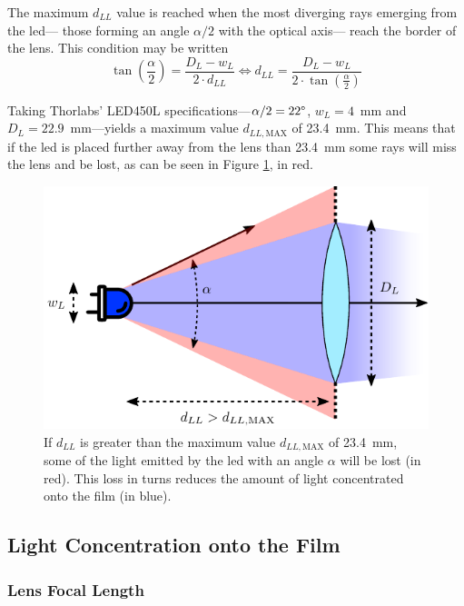 The maximum $d_{LL}$ value is reached when the most diverging rays emerging from the \gls{led}---\ie{} those forming an angle $\alpha/2$ with the optical axis--- reach the border of the lens. This condition may be written
\begin{equation}
	\tan \left( \frac{\alpha}{2} \right) = \frac{D_L - w_L}{2 \cdot d_{LL}} \iff
	d_{LL} = \frac{D_L - w_L}{2 \cdot \tan \left( \frac{\alpha}{2}\right) }
\end{equation}

Taking Thorlabs' LED450L specifications---$\alpha/2=22\degree$, $w_L=4$~mm and $D_L=22.9$~mm---yields a maximum value $d_{LL,\mathrm{MAX}}$ of 23.4~mm. This means that if the \gls{led} is placed further away from the lens than 23.4~mm some rays will miss the lens and be lost, as can be seen in Figure \ref{anfig:optics:illuminating_lost_rays}, in red.

\begin{figure}
	\centering
	\includegraphics{2_appendices/optical_figures/illuminating_lost_rays_converted.pdf}
	\caption[$d_{LL}$ maximum value.]{If $d_{LL}$ is greater than the maximum value $d_{LL,\mathrm{MAX}}$ of 23.4~mm, some of the light emitted by the \gls{led} with an angle $\alpha$ will be lost (in red). This loss in turns reduces the amount of light concentrated onto the film (in blue).}
	\label{anfig:optics:illuminating_lost_rays}
\end{figure}

\subsection{Light Concentration onto the Film}

\subsubsection{Lens Focal Length}\label{ansubsect:optics:lens_f}

